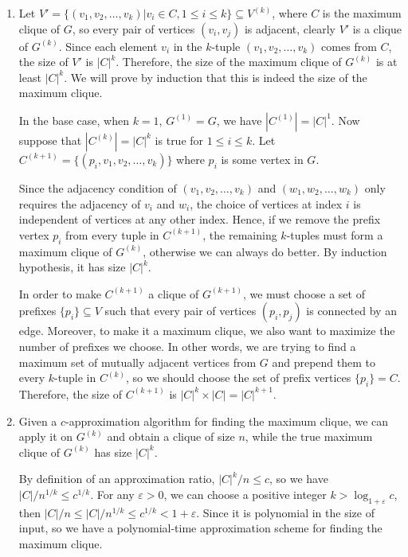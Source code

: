 \documentclass[11pt]{article}
\begin{document}
    \solution
    \begin{enumerate}[leftmargin=*, topsep=0pt]
      \item Let $V' = \{(v_1, v_2, \dots, v_k) | v_i \in C, 1 \leq i \leq k\} \subseteq V^{(k)}$, where $C$ is the maximum clique of $G$, so every pair of vertices $(v_i, v_j)$ is adjacent, clearly $V'$ is a clique of $G^{(k)}$. Since each element $v_i$ in the $k$-tuple $(v_1, v_2, \dots, v_k)$ comes from $C$, the size of $V'$ is $|C|^k$. Therefore, the size of the maximum clique of $G^{(k)}$ is at least $|C|^k$. We will prove by induction that this is indeed the size of the maximum clique.

      In the base case, when $k = 1$, $G^{(1)} = G$, we have $|C^{(1)}| = |C|^1$. Now suppose that $|C^{(k)}| = |C|^k$ is true for $1 \leq i \leq k$. Let $C^{(k+1)} = \{(p_i, v_1, v_2, \dots, v_k)\}$ where $p_i$ is some vertex in $G$.

      Since the adjacency condition of $(v_1, v_2, \dots, v_k)$ and $(w_1, w_2, \dots, w_k)$ only requires the adjacency of $v_i$ and $w_i$, the choice of vertices at index $i$ is independent of vertices at any other index. Hence, if we remove the prefix vertex $p_i$ from every tuple in $C^{(k+1)}$, the remaining $k$-tuples must form a maximum clique of $G^{(k)}$, otherwise we can always do better. By induction hypothesis, it has size $|C|^k$.

      In order to make $C^{(k+1)}$ a clique of $G^{(k+1)}$, we must choose a set of prefixes $\{p_i\} \subseteq V$ such that every pair of vertices $(p_i, p_j)$ is connected by an edge. Moreover, to make it a maximum clique, we also want to maximize the number of prefixes we choose. In other words, we are trying to find a maximum set of mutually adjacent vertices from $G$ and prepend them to every $k$-tuple in $C^{(k)}$, so we should choose the set of prefix vertices $\{p_i\} = C$. Therefore, the size of $C^{(k+1)}$ is $|C|^k \times |C| = |C|^{k+1}$.

      \item Given a $c$-approximation algorithm for finding the maximum clique, we can apply it on $G^{(k)}$ and obtain a clique of size $n$, while the true maximum clique of $G^{(k)}$ has size $|C|^k$.

      By definition of an approximation ratio, $|C|^k/n \leq c$, so we have $|C|/n^{1/k} \leq c^{1/k}$. For any $\varepsilon > 0$, we can choose a positive integer $k > \log_{1+\varepsilon}{c}$, then $|C|/n \leq |C|/n^{1/k} \leq c^{1/k} < 1 + \varepsilon$. Since it is polynomial in the size of input, so we have a polynomial-time approximation scheme for finding the maximum clique.
    \end{enumerate}
\end{document}

